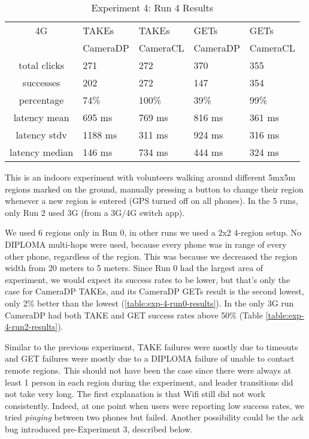 \begin{table}[htb]
\begin{scriptsize} 
\caption{Experiment 4: Run 4 Results} 
\label{table:exp-4-run4-results}
 \begin{center}
 \begin{tabular}{| c | p{1.5cm} | p{1.5cm} | p{1.5cm} | p{1.4cm} |}
  \hline
  4G & TAKEs & TAKEs & GETs & GETs \\
  & CameraDP & CameraCL & CameraDP & CameraCL \\
  \hline
  total clicks & 271 & 272 & 370 & 355 \\
  \hline
  successes & 202 & 272 & 147 & 354 \\
  \hline
  percentage & 74\% & 100\% & 39\% & 99\% \\
  \hline
  latency mean & 695 ms & 769 ms & 816 ms & 361 ms \\
  \hline
  latency stdv & 1188 ms & 311 ms & 924 ms & 316 ms \\
  \hline
  latency median & 146 ms & 734 ms & 444 ms & 324 ms \\
  \hline
  \end{tabular}
  \end{center}
\end{scriptsize}
\end{table}

This is an indoors experiment with volunteers walking around different 5mx5m regions marked on the ground, manually pressing a button to change their region whenever a new region is entered (GPS turned off on all phones). In the 5 runs, only Run 2 used 3G (from a 3G/4G switch app).

We used 6 regions only in Run 0, in other runs we used a 2x2 4-region setup. No DIPLOMA multi-hops were used, because every phone was in range of every other phone, regardless of the region. This was because we decreased the region width from 20 meters to 5 meters. Since Run 0 had the largest area of experiment, we would expect its success rates to be lower, but that's only the case for CameraDP TAKEs, and its CameraDP GETs result is the second lowest, only 2\% better than the lowest (\ref{table:exp-4-run0-results}). In the only 3G run CameraDP had both TAKE and GET success rates above 50\% (Table \ref{table:exp-4-run2-results}).

Similar to the previous experiment, TAKE failures were mostly due to timeouts and GET failures were mostly due to a DIPLOMA failure of unable to contact remote regions. This should not have been the case since there were always at least 1 person in each region during the experiment, and leader transitions did not take very long. The first explanation is that Wifi still did not work consistently. Indeed, at one point when users were reporting low success rates, we tried {\it pinging} between two phones but failed. Another possibility could be the ack bug introduced pre-Experiment 3, described below.

